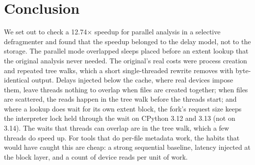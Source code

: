 \section{Conclusion}
\label{sec:conclusion}

We set out to check a 12.74$\times$ speedup for parallel analysis in a selective
defragmenter and found that the speedup belonged to the delay model, not to the
storage. The parallel mode overlapped sleeps placed before an extent lookup that the
original analysis never needed. The original's real costs were process creation and
repeated tree walks, which a short single-threaded rewrite removes with
byte-identical output. Delays injected below the cache, where real devices impose
them, leave threads nothing to overlap when files are created together; when files
are scattered, the reads happen in the tree walk before the threads start; and where
a lookup does wait for its own extent block, the fork's request size keeps the
interpreter lock held through the wait on CPython 3.12 and 3.13 (not on 3.14). The
waits that threads can overlap are in the tree walk, which a few threads do speed up.
For tools that do per-file metadata work, the
habits that would have caught this are cheap: a strong sequential baseline, latency
injected at the block layer, and a count of device reads per unit of work.
